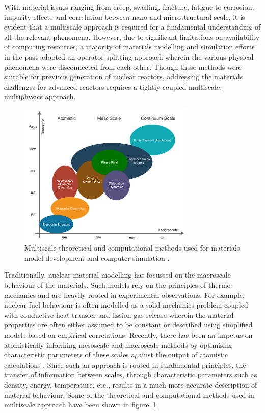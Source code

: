 	With material issues ranging from creep, swelling, fracture, fatigue to corrosion, impurity  effects and correlation between nano and microstructural scale, it is evident that a multiscale approach is required for a fundamental understanding of all the relevant phenomena. However, due to significant limitations on availability of computing resources, a majority of materials modelling and simulation efforts in the past adopted an operator splitting approach wherein the various physical phenomena were disconnected from each other. Though these methods were suitable for previous generation of nuclear reactors, addressing the materials challenges for advanced reactors requires a tightly coupled multiscale, multiphysics approach.

	\begin{figure}[htbp]
		\centering
		\includegraphics[width=0.75\textwidth]{figures/Multiphysics.pdf}
		\caption{Multiscale theoretical and computational methods used for materials model development and computer simulation \cite{STAN200920}.}
		\label{fig:multiphys}
	\end{figure}

	Traditionally, nuclear material modelling has focussed on the macroscale behaviour of the materials. Such models rely on the principles of thermo-mechanics and are heavily rooted in experimental observations. For example, nuclear fuel behaviour is often modelled as a solid mechanics problem coupled with conductive heat transfer and fission gas release wherein the material properties are often either assumed to be constant or described using simplified models based on empirical correlations. Recently, there has been an impetus on atomistically informing mesoscale  and macroscale methods by optimising characteristic parameters of these scales against the output of atomistic calculations \cite{STAN200920}. Since such an approach is rooted in fundamental principles, the transfer of information between scales, through characteristic parameters such as density, energy, temperature, etc., results in a much more accurate description of material behaviour. Some of the theoretical and computational methods used in multiscale approach have been shown in figure~\ref{fig:multiphys}.

